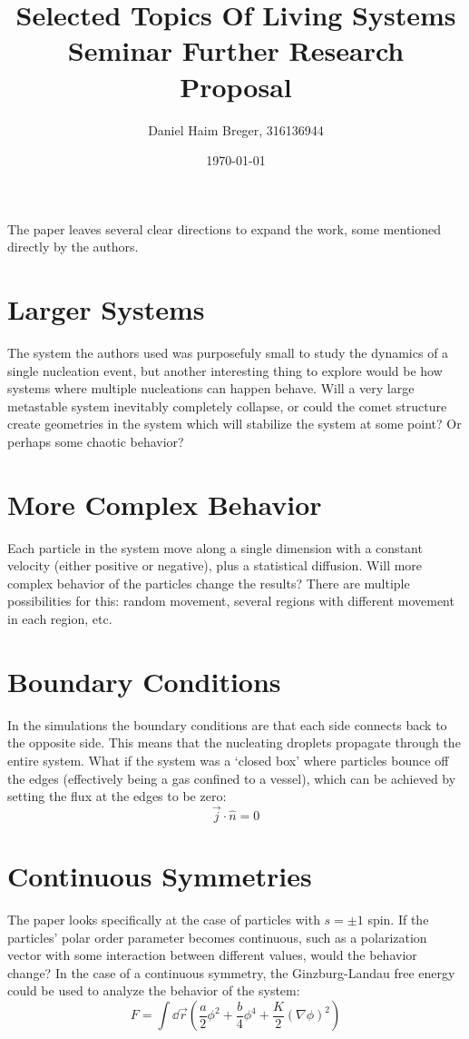 \documentclass[10pt]{penrose}
\title[Seminar Further Research]{Selected Topics Of Living Systems Seminar Further Research Proposal}
\author{Daniel Haim Breger, 316136944}
\affiliation{Technion}
\date{\today}
\begin{document}
	\maketitle
	The paper leaves several clear directions to expand the work, some mentioned directly by the authors.
    \section{Larger Systems}
    The system the authors used was purposefuly small to study the dynamics of a single nucleation event, but another interesting thing to explore would be how systems where multiple nucleations can happen behave. Will a very large metastable system inevitably completely collapse, or could the comet structure create geometries in the system which will stabilize the system at some point? Or perhaps some chaotic behavior?
    \section{More Complex Behavior}
    Each particle in the system move along a single dimension with a constant velocity (either positive or negative), plus a statistical diffusion. Will more complex behavior of the particles change the results? There are multiple possibilities for this: random movement, several regions with different movement in each region, etc.
    \section{Boundary Conditions}
    In the simulations the boundary conditions are that each side connects back to the opposite side. This means that the nucleating droplets propagate through the entire system. What if the system was a `closed box' where particles bounce off the edges (effectively being a gas confined to a vessel), which can be achieved by setting the flux at the edges to be zero:
    \begin{equation}
        \vec{j}\cdot \hat{n} = 0
    \end{equation}
    \section{Continuous Symmetries}
    The paper looks specifically at the case of particles with \(s=\pm 1\) spin. If the particles' polar order parameter becomes continuous, such as a polarization vector with some interaction between different values, would the behavior change? In the case of a continuous symmetry, the Ginzburg-Landau free energy could be used to analyze the behavior of the system:
    \begin{equation}
        F = \int \dd \vec{r}\left(\frac{a}{2}\phi^2 + \frac{b}{4}\phi^4 + \frac{K}{2}{\left(\nabla\phi\right)}^2\right)
    \end{equation}
\end{document}
